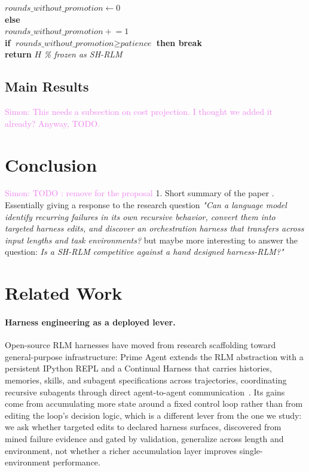 \documentclass{article}
\newcommand{\SC}[1]{\textcolor{violet}{Simon: #1}}
\begin{document}
{\begin{minipage}{\dimexpr\linewidth-2\fboxsep-2\fboxrule\relax}
    \hspace*{3.0em} $\textit{rounds\_without\_promotion} \leftarrow 0$ \\
    \hspace*{1.5em} \textbf{else} \\
    \hspace*{3.0em} $\textit{rounds\_without\_promotion} \mathrel{+}= 1$ \\
    \hspace*{3.0em} \textbf{if} $\textit{rounds\_without\_promotion} \ge \textit{patience}$ \textbf{then break} \\
    \textbf{return} $H$ \hfill \textit{\% frozen as SH-RLM}
\end{minipage}%
}
\subsection{Main Results}

\SC{This needs a subsection on cost projection. I thought we added it already? Anyway, TODO.}

\section{Conclusion}
\SC{TODO :  remove for the proposal}
1.  Short summary of the paper .  Essentially giving a response to the research question \textit{"Can a language model identify recurring failures in its own recursive behavior,
convert them into targeted harness edits, and discover an orchestration harness
that transfers across input lengths and task environments?} but maybe more interesting to answer the question: \textit{Is a SH-RLM competitive against a hand designed harness-RLM?"} 

\section{Related Work}

\paragraph{Harness engineering as a deployed lever.}
Open-source RLM harnesses have moved from research scaffolding toward general-purpose infrastructure: Prime Agent extends the RLM abstraction with a persistent IPython REPL and a Continual Harness that carries histories, memories, skills, and subagent specifications across trajectories, coordinating recursive subagents through direct agent-to-agent communication~\citep{primeintellect2026primeagent}. Its gains come from accumulating more state around a fixed control loop rather than from editing the loop's decision logic, which is a different lever from the one we study: we ask whether targeted edits to declared harness surfaces, discovered from mined failure evidence and gated by validation, generalize across length and environment, not whether a richer accumulation layer improves single-environment performance.
\end{document}
